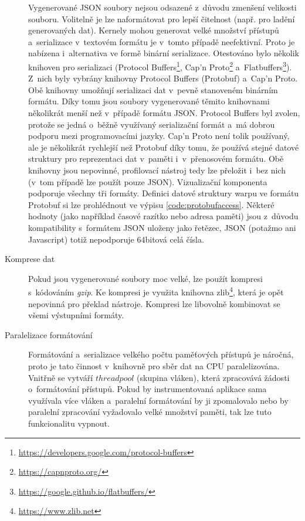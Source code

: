 \begin{description}
    Vygenerované JSON soubory nejsou odsazené z~důvodu zmenšení velikosti souboru. Volitelně je lze naformátovat pro lepší čitelnost (např. pro ladění generovaných dat). Kernely mohou generovat velké množství přístupů a~serializace v~textovém formátu je v~tomto případě neefektivní. Proto je nabízena i~alternativa ve formě binární serializace. Otestováno bylo několik knihoven pro serializaci (Protocol Buffers\footnote{\url{https://developers.google.com/protocol-buffers}}, Cap'n Proto\footnote{\url{https://capnproto.org/}} a~Flatbuffers\footnote{\url{https://google.github.io/flatbuffers/}}). Z~nich byly vybrány knihovny Protocol Buffers (Protobuf) a~Cap'n Proto. Obě knihovny umožňují serializaci dat v~pevně stanoveném binárním formátu. Díky tomu jsou soubory vygenerované těmito knihovnami několikrát menší než v~případě formátu JSON. Protocol Buffers byl zvolen, protože se jedná o~běžně využívaný serializační formát a~má dobrou podporu mezi programovacími jazyky. Cap'n Proto není tolik používaný, ale je několikrát rychlejší než Protobuf díky tomu, že používá stejné datové struktury pro reprezentaci dat v~paměti i~v~přenosovém formátu. Obě knihovny jsou nepovinné, profilovací nástroj tedy lze přeložit i~bez nich (v~tom případě lze použít pouze JSON). Vizualizační komponenta podporuje všechny tři formáty. Definici datové \mbox{struktury} warpu ve formátu Protobuf si lze prohlédnout ve výpisu \ref{code:protobufaccess}. Některé hodnoty (jako například časové razítko nebo adresa paměti) jsou z~důvodu kompatibility s~formátem JSON uloženy jako řetězec, JSON (potažmo ani Javascript) totiž nepodporuje 64bitová celá čísla.
    \item[Komprese dat] Pokud jsou vygenerované soubory moc velké, lze použít kompresi s~kódováním \emph{gzip}. Ke kompresi je využita knihovna zlib\footnote{\url{https://www.zlib.net}}, která je opět nepovinná pro překlad nástroje. Kompresi lze libovolně kombinovat se všemi výstupními formáty.
    \item[Paralelizace formátování] Formátování a~serializace velkého počtu paměťových přístupů je náročná, proto je tato činnost v~knihovně pro sběr dat na CPU paralelizována. Vnitřně se vytváří $thread pool$ (skupina vláken), která zpracovává žádosti o~formátování přístupů. Pokud by instrumentovaná aplikace sama využívala více vláken a~paralelní formátování by ji zpomalovalo nebo by paralelní zpracování vyžadovalo velké množství paměti, tak lze tuto funkcionalitu vypnout.
\end{description}
